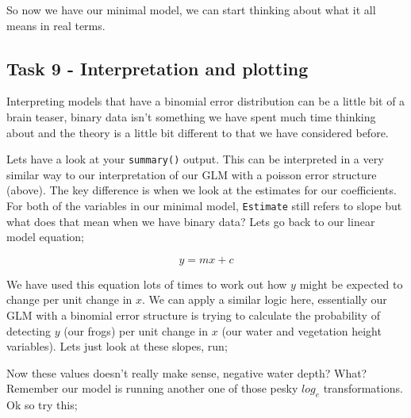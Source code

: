 \documentclass[
]{book}
\newenvironment{Shaded}{\begin{snugshade}}{\end{snugshade}}
\newcommand{\DecValTok}[1]{\textcolor[rgb]{0.00,0.00,0.81}{#1}}
\newcommand{\FunctionTok}[1]{\textcolor[rgb]{0.13,0.29,0.53}{\textbf{#1}}}
\newcommand{\NormalTok}[1]{#1}
\newcommand{\SpecialCharTok}[1]{\textcolor[rgb]{0.81,0.36,0.00}{\textbf{#1}}}
\begin{document}
So now we have our minimal model, we can start thinking about what it all means in real terms.

\hypertarget{task-9---interpretation-and-plotting}{%
\subsection{Task 9 - Interpretation and plotting}\label{task-9---interpretation-and-plotting}}

Interpreting models that have a binomial error distribution can be a little bit of a brain teaser, binary data isn't something we have spent much time thinking about and the theory is a little bit different to that we have considered before.

Lets have a look at your \texttt{summary()} output. This can be interpreted in a very similar way to our interpretation of our GLM with a poisson error structure (above). The key difference is when we look at the estimates for our coefficients. For both of the variables in our minimal model, \texttt{Estimate} still refers to slope but what does that mean when we have binary data? Lets go back to our linear model equation;

\[
y = mx + c
\]

We have used this equation lots of times to work out how \(y\) might be expected to change per unit change in \(x\). We can apply a similar logic here, essentially our GLM with a binomial error structure is trying to calculate the probability of detecting \(y\) (our frogs) per unit change in \(x\) (our water and vegetation height variables). Lets just look at these slopes, run;

\begin{Shaded}
\end{Shaded}

Now these values doesn't really make sense, negative water depth? What? Remember our model is running another one of those pesky \(log_e\) transformations. Ok so try this;

\begin{Shaded}
\end{Shaded}
\end{document}
